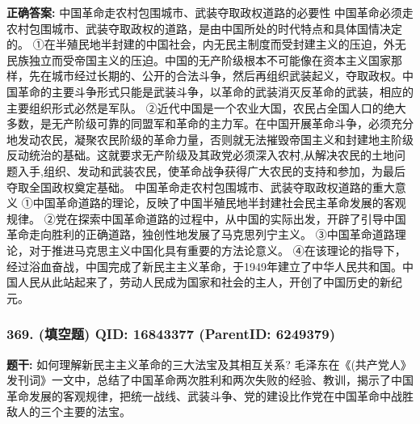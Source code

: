 \documentclass[12pt,UTF8]{ctexart}
\begin{document}
\textbf{正确答案:}
中国革命走农村包围城市、武装夺取政权道路的必要性
中国革命必须走农村包围城市、武装夺取政权的道路，是由中国所处的时代特点和具体国情决定的。
①在半殖民地半封建的中国社会，内无民主制度而受封建主义的压迫，外无民族独立而受帝国主义的压迫。中国的无产阶级根本不可能像在资本主义国家那样，先在城市经过长期的、公开的合法斗争，然后再组织武装起义，夺取政权。中国革命的主要斗争形式只能是武装斗争，以革命的武装消灭反革命的武装，相应的主要组织形式必然是军队。
②近代中国是一个农业大国，农民占全国人口的绝大多数，是无产阶级可靠的同盟军和革命的主力军。在中国开展革命斗争，必须充分地发动农民，凝聚农民阶级的革命力量，否则就无法摧毁帝国主义和封建地主阶级反动统治的基础。这就要求无产阶级及其政党必须深入农村,从解决农民的土地问题入手,组织、发动和武装农民，使革命战争获得广大农民的支持和参加，为最后夺取全国政权奠定基础。
中国革命走农村包围城市、武装夺取政权道路的重大意义
①中国革命道路的理论，反映了中国半殖民地半封建社会民主革命发展的客观规律。
②党在探索中国革命道路的过程中，从中国的实际出发，开辟了引导中国革命走向胜利的正确道路，独创性地发展了马克思列宁主义。
③中国革命道路理论，对于推进马克思主义中国化具有重要的方法论意义。
④在该理论的指导下，经过浴血奋战，中国完成了新民主主义革命，于1949年建立了中华人民共和国。中国人民从此站起来了，劳动人民成为国家和社会的主人，开创了中国历史的新纪元。

\vspace{0.3em}\hrulefill\vspace{0.7em}

\subsubsection*{369. (填空题) \small QID: 16843377 (ParentID: 6249379)}

\textbf{题干:}
如何理解新民主主义革命的三大法宝及其相互关系?
毛泽东在《(共产党人》发刊词》一文中，总结了中国革命两次胜利和两次失败的经验、教训，揭示了中国革命发展的客观规律，把统一战线、武装斗争、党的建设比作党在中国革命中战胜敌人的三个主要的法宝。
\end{document}
